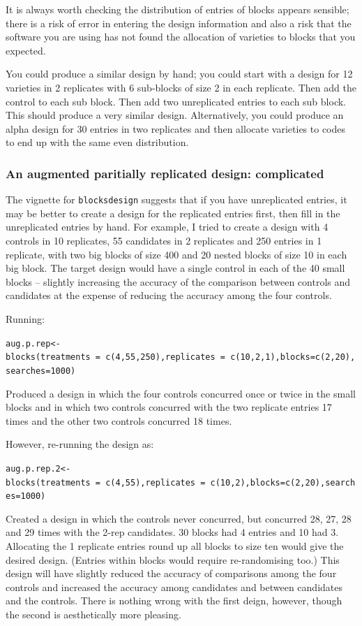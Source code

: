 \documentclass[
]{book}
\begin{document}
It is always worth checking the distribution of entries of blocks appears sensible; there is a risk of error in entering the design information and also a risk that the software you are using has not found the allocation of varieties to blocks that you expected.

You could produce a similar design by hand; you could start with a design for 12 varieties in 2 replicates with 6 sub-blocks of size 2 in each replicate. Then add the control to each sub block. Then add two unreplicated entries to each sub block. This should produce a very similar design. Alternatively, you could produce an alpha design for 30 entries in two replicates and then allocate varieties to codes to end up with the same even distribution.

\hypertarget{an-augmented-paritially-replicated-design-complicated}{%
\subsubsection{An augmented paritially replicated design: complicated}\label{an-augmented-paritially-replicated-design-complicated}}

The vignette for \texttt{blocksdesign} suggests that if you have unreplicated entries, it may be better to create a design for the replicated entries first, then fill in the unreplicated entries by hand. For example, I tried to create a design with 4 controls in 10 replicates, 55 candidates in 2 replicates and 250 entries in 1 replicate, with two big blocks of size 400 and 20 nested blocks of size 10 in each big block. The target design would have a single control in each of the 40 small blocks -- slightly increasing the accuracy of the comparison between controls and candidates at the expense of reducing the accuracy among the four controls.

Running:

\texttt{aug.p.rep\textless{}-blocks(treatments\ =\ c(4,55,250),replicates\ =\ c(10,2,1),blocks=c(2,20),searches=1000)}

Produced a design in which the four controls concurred once or twice in the small blocks and in which two controls concurred with the two replicate entries 17 times and the other two controls concurred 18 times.

However, re-running the design as:

\texttt{aug.p.rep.2\textless{}-blocks(treatments\ =\ c(4,55),replicates\ =\ c(10,2),blocks=c(2,20),searches=1000)}

Created a design in which the controls never concurred, but concurred 28, 27, 28 and 29 times with the 2-rep candidates. 30 blocks had 4 entries and 10 had 3. Allocating the 1 replicate entries round up all blocks to size ten would give the desired design. (Entries within blocks would require re-randomising too.) This design will have slightly reduced the accuracy of comparisons among the four controls and increased the accuracy among candidates and between candidates and the controls. There is nothing wrong with the first deign, however, though the second is aesthetically more pleasing.
\end{document}
